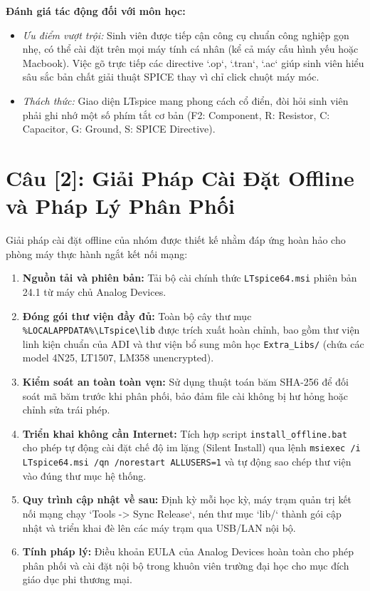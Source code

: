 \documentclass[12pt,a4paper]{report}
\begin{document}
\textbf{Đánh giá tác động đối với môn học:}
\begin{itemize}[noitemsep]
    \item \textit{Ưu điểm vượt trội:} Sinh viên được tiếp cận công cụ chuẩn công nghiệp gọn nhẹ, có thể cài đặt trên mọi máy tính cá nhân (kể cả máy cấu hình yếu hoặc Macbook). Việc gõ trực tiếp các directive `.op`, `.tran`, `.ac` giúp sinh viên hiểu sâu sắc bản chất giải thuật SPICE thay vì chỉ click chuột máy móc.
    \item \textit{Thách thức:} Giao diện LTspice mang phong cách cổ điển, đòi hỏi sinh viên phải ghi nhớ một số phím tắt cơ bản (F2: Component, R: Resistor, C: Capacitor, G: Ground, S: SPICE Directive).
\end{itemize}

\section*{Câu [2]: Giải Pháp Cài Đặt Offline và Pháp Lý Phân Phối}

Giải pháp cài đặt offline của nhóm được thiết kế nhằm đáp ứng hoàn hảo cho phòng máy thực hành ngắt kết nối mạng:
\begin{enumerate}
    \item \textbf{Nguồn tải và phiên bản:} Tải bộ cài chính thức \texttt{LTspice64.msi} phiên bản 24.1 từ máy chủ Analog Devices.
    \item \textbf{Đóng gói thư viện đầy đủ:} Toàn bộ cây thư mục \texttt{\%LOCALAPPDATA\%\textbackslash LTspice\textbackslash lib} được trích xuất hoàn chỉnh, bao gồm thư viện linh kiện chuẩn của ADI và thư viện bổ sung môn học \texttt{Extra\_Libs/} (chứa các model 4N25, LT1507, LM358 unencrypted).
    \item \textbf{Kiểm soát an toàn toàn vẹn:} Sử dụng thuật toán băm SHA-256 để đối soát mã băm trước khi phân phối, bảo đảm file cài không bị hư hỏng hoặc chỉnh sửa trái phép.
    \item \textbf{Triển khai không cần Internet:} Tích hợp script \texttt{install\_offline.bat} cho phép tự động cài đặt chế độ im lặng (Silent Install) qua lệnh \lstinline|msiexec /i LTspice64.msi /qn /norestart ALLUSERS=1| và tự động sao chép thư viện vào đúng thư mục hệ thống.
    \item \textbf{Quy trình cập nhật về sau:} Định kỳ mỗi học kỳ, máy trạm quản trị kết nối mạng chạy `Tools -> Sync Release`, nén thư mục `lib/` thành gói cập nhật và triển khai đè lên các máy trạm qua USB/LAN nội bộ.
    \item \textbf{Tính pháp lý:} Điều khoản EULA của Analog Devices hoàn toàn cho phép phân phối và cài đặt nội bộ trong khuôn viên trường đại học cho mục đích giáo dục phi thương mại.
\end{enumerate}
\end{document}
